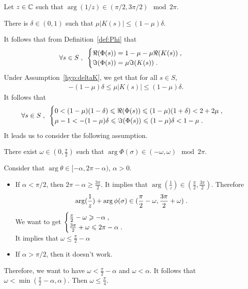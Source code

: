 Let $z \in \mathbb{C}$ such that $\arg(1/z) \in (\pi/2, 3\pi/2) \mod 2\pi$.
\begin{hypothesis}
    There is $\delta \in (0,1)$ such that $ \mu |K(s)| \leq (1-\mu)\delta$.
    \label{hyp:deltaK}
\end{hypothesis}
It follows that from Definition~\eqref{def:Phi} that 
$$\forall s \in S \; , \enspace 
\begin{cases}
    \Re(\Phi(s)) = 1-\mu-\mu \Re(K(s))\; , \enspace \\
    \Im(\Phi(s)) = \mu \Im(K(s))\; .
\end{cases}
$$
Under Assumption~\ref{hyp:deltaK}, we get that for all $s \in S$, 
    \begin{align*}
     -(1-\mu)\delta \leq \mu |K(s)| \leq (1-\mu)\delta.
    \end{align*}
It follows that
$$\forall s \in S \; , \enspace 
\begin{cases}
    0 < (1-\mu)(1-\delta) \leqslant \Re(\Phi(s)) \leqslant (1-\mu)(1+\delta) < 2 + 2\mu \; ,
    \\ 
   \mu-1 < -(1-\mu) \delta \leqslant \Im(\Phi(s)) \leqslant (1-\mu) \delta < 1-\mu \; .
\end{cases}
$$
It leads us to consider the following assumption.
\begin{hypothesis}
There exist $\omega \in \left(0, \frac\pi2 \right)$ such that $\arg\Phi(\sigma) \in (-\omega, \omega) \mod 2\pi$.   
\end{hypothesis}

Consider that $\arg \theta \in [-\alpha, 2\pi-\alpha)$, $\alpha > 0$.
\begin{itemize}
    \item If $\alpha < \pi / 2$, then 
    $2\pi - \alpha \geq \frac{3\pi}{2}$. It implies that $\arg(\frac1z) \in (\frac\pi2, \frac{3\pi}{2})$. Therefore
    $$ \arg(\frac1z) + \arg \phi(\sigma) \in (\frac\pi2 - \omega, \frac{3\pi}{2}+\omega)\; .$$
    We want to get 
    $\begin{cases}
        \frac{\pi}{2}-\omega \geqslant - \alpha \; , \enspace
        \\
        \frac{3\pi}{2}+\omega \leqslant 2\pi-\alpha \; .
    \end{cases}$ \\
    It implies that $\omega \leq \frac{\pi}{2}-\alpha$
    \item If $\alpha > \pi / 2$, then it doesn't work. 
\end{itemize}
Therefore, we want to have $ \omega < \frac{\pi}{2}-\alpha$ and $\omega < \alpha$.
It follows that $\omega < \min(\frac\pi2 - \alpha, \alpha)$. Then $\omega \leq \frac\pi4$.  

